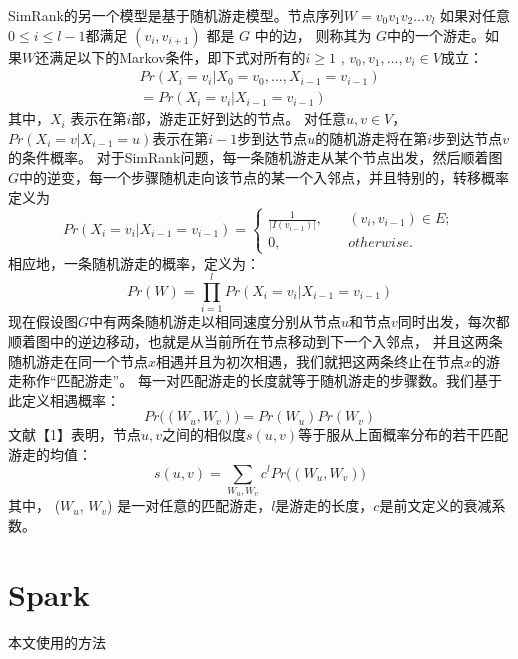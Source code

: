 \documentclass[master]{njuthesis}
\begin{document}
SimRank的另一个模型是基于随机游走模型。节点序列$W=v_0v_1v_2\dots v_l$ 如果对任意$0 \leq i \leq l-1$都满足 $(v_i, v_{i+1})$ 都是 $G$ 中的边，
则称其为 $G$中的一个游走。如果$W$还满足以下的Markov条件，即下式对所有的$i \geq1$ ,   $v_0, v_1, \dots, v_i \in V$成立：
\begin{eqnarray}
\label{eq:three}
  Pr(X_i = v_i|X_{0} = v_{0},\dots, X_{i-1}  = v_{i-1}) \nonumber \\  
 =  Pr(X_i = v_i|X_{i-1} = v_{i-1})
\end{eqnarray}
其中，$X_i$ 表示在第$i$部，游走正好到达的节点。
对任意$ u,v \in V$， $Pr(X_i=v|X_{i-1}=u)$表示在第$i-1$步到达节点$u$的随机游走将在第$i$步到达节点$v$的条件概率。
对于SimRank问题，每一条随机游走从某个节点出发，然后顺着图$G$中的逆变，每一个步骤随机走向该节点的某一个入邻点，并且特别的，转移概率定义为
\begin{equation}
Pr(X_i=v_i|X_{i-1}=v_{i-1}) = \left\{
        \begin{array}{ll}
	\frac{1}{|I(v_{i-1})|}, & \quad (v_i, v_{i-1}) \in E; \\
	0,  &\quad otherwise.
        \end{array}
    \right.
	\label{eq:four}
\end{equation}
相应地，一条随机游走的概率，定义为：
 \begin{equation}
Pr(W) = \prod_{i=1}^{l}Pr(X_i=v_i|X_{i-1}=v_{i-1})
	\label{eq:seven}
\end{equation}
现在假设图$G$中有两条随机游走以相同速度分别从节点$u$和节点$v$同时出发，每次都顺着图中的逆边移动，也就是从当前所在节点移动到下一个入邻点，
并且这两条随机游走在同一个节点$x$相遇并且为初次相遇，我们就把这两条终止在节点$x$的游走称作“匹配游走”。
每一对匹配游走的长度就等于随机游走的步骤数。我们基于此定义相遇概率：
 \begin{equation}
Pr\big((W_u, W_v)\big) = Pr(W_u)Pr(W_v)
	\label{eq:five}
\end{equation}
文献【1】表明，节点$u,v$之间的相似度$s(u,v)$等于服从上面概率分布的若干匹配游走的均值：
 \begin{equation}
s(u,v) = \sum\limits_{W_u, W_v} c^lPr\big((W_u, W_v)\big)
	\label{eq:six}
\end{equation}
其中， ($W_u$, $W_v$) 是一对任意的匹配游走，$l$是游走的长度，$c$是前文定义的衰减系数。

\section{Spark}
本文使用的方法
\end{document}
